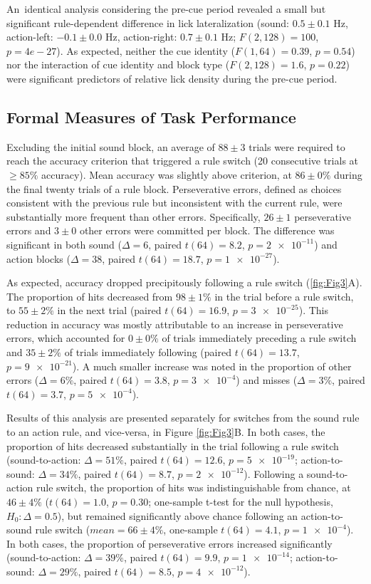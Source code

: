 An\ identical analysis considering the pre-cue period revealed a small but significant  rule-dependent difference in lick lateralization (sound: $0.5 \pm 0.1$ Hz, action-left: $-0.1 \pm 0.0$ Hz, action-right: $0.7 \pm 0.1$ Hz; $F(2,128) =100$, $p=4e-27$). As expected, neither the cue identity ($F(1,64) =0.39$, $p=0.54$) nor the interaction of cue identity and block type ($F(2,128) =1.6$, $p=\num{0.22}$) were significant predictors of relative lick density during the pre-cue period.

\subsection*{Formal Measures of Task Performance}
Excluding the initial sound block, an average of $88 \pm 3$ trials were required to reach the accuracy criterion that triggered a rule switch (20 consecutive trials at $ \geq 85\%$ accuracy). Mean accuracy was slightly above criterion, at $86 \pm 0 \%$ during the final twenty trials of a rule block. Perseverative errors, defined as choices consistent with the previous rule but inconsistent with the current rule, were substantially more frequent than other errors. Specifically, $26 \pm 1$ perseverative errors and $3 \pm 0$ other errors were committed per block. The difference was significant in both sound ($\Delta=6$, paired $t(64) =8.2$, $p=\num{2e-11}$) and action blocks ($\Delta=38$, paired $t(64) =18.7$, $p=\num{1e-27}$).



As expected, accuracy dropped precipitously following a rule switch (\ref{fig:Fig3}A). The proportion of hits decreased from $98 \pm 1 \%$ in the trial before a rule switch, to $55 \pm 2 \%$ in the next trial (paired $t(64) =16.9$, $p=\num{3e-25}$). This reduction in accuracy was mostly attributable to an increase in perseverative errors, which accounted for $0 \pm 0 \%$ of trials immediately preceding a rule switch and $35 \pm 2 \%$ of trials immediately following (paired $t(64) =13.7$, $p=\num{9e-21}$). A much smaller increase was noted in the proportion of other errors ($\Delta=6\%$, paired $t(64) =3.8$, $p=\num{3e-4}$) and misses ($\Delta=3\%$, paired $t(64) =3.7$, $p=\num{5e-4}$). 

Results of this analysis are presented separately for switches from the sound rule to an action rule, and vice-versa, in Figure \ref{fig:Fig3}B. In both cases, the proportion of hits decreased substantially in the trial following a rule switch (sound-to-action: $\Delta=51\%$, paired $t(64) =12.6$, $p=\num{5e-19}$; action-to-sound: $\Delta=34\%$, paired $t(64) =8.7$, $p=\num{2e-12}$). Following a sound-to-action rule switch, the proportion of hits was indistinguishable from chance, at $46 \pm 4 \%$ ($t(64)=1.0$, $p=0.30$; one-sample t-test for the null hypothesis, $H_0:\Delta=0.5$), but remained significantly above chance following an action-to-sound rule switch ($mean=66 \pm 4 \%$, one-sample $t(64)=4.1$, $p=\num{1e-4}$). In both cases, the proportion of perseverative errors increased significantly (sound-to-action: $\Delta=39\%$, paired $t(64) =9.9$, $p=\num{1e-14}$; action-to-sound: $\Delta=29\%$, paired $t(64) =8.5$, $p=\num{4e-12}$).  

